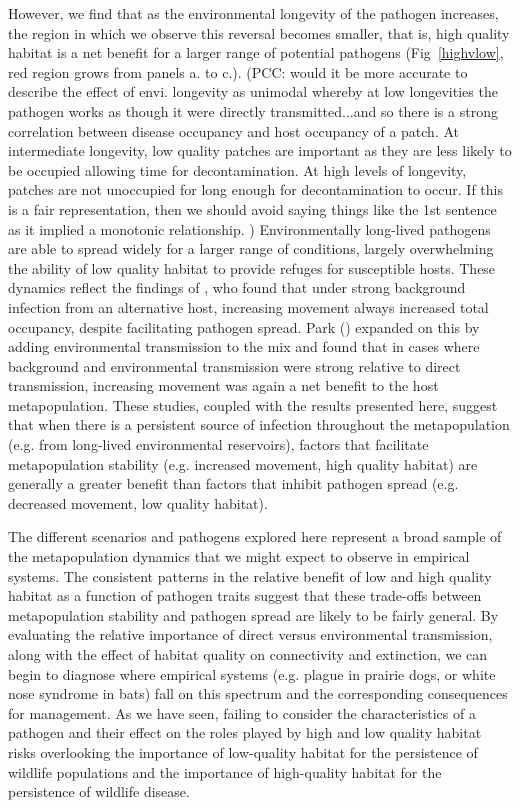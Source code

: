 \documentclass{article}
\begin{document}
However, we find that as the environmental longevity of the pathogen increases, the region in which we observe this reversal becomes smaller, that is, high quality habitat is a net benefit for a larger range of potential pathogens (Fig~\ref{highvlow}, red region grows from panels a. to c.).  (PCC: would it be more accurate to describe the effect of envi. longevity as unimodal whereby at low longevities the pathogen works as though it were directly transmitted...and so there is a strong correlation between disease occupancy and host occupancy of a patch.  At intermediate longevity, low quality patches are important as they are less likely to be occupied allowing time for decontamination. At high levels of longevity, patches are not unoccupied for long enough for decontamination to occur.  If this is a fair representation, then we should avoid saying things like the 1st sentence as it implied a monotonic relationship. )
Environmentally long-lived pathogens are able to spread widely for a larger range of conditions, largely overwhelming the ability of low quality habitat to provide refuges for susceptible hosts. 
These dynamics reflect the findings of \cite{Gog2002}, who found that under strong background infection from an alternative host, increasing movement always increased total occupancy, despite facilitating pathogen spread.  
Park (\cite{Park2012}) expanded on this by adding environmental transmission to the mix and found that in cases where background and environmental transmission were strong relative to direct transmission, increasing movement was again a net benefit to the host metapopulation.  
These studies, coupled with the results presented here, suggest that when there is a persistent source of infection throughout the metapopulation (e.g. from long-lived environmental reservoirs), factors that facilitate metapopulation stability (e.g. increased movement, high quality habitat) are generally a greater benefit than factors that inhibit pathogen spread (e.g. decreased movement, low quality habitat). 

The different scenarios and pathogens explored here represent a broad sample of the metapopulation dynamics that we might expect to observe in empirical systems.
The consistent patterns in the relative benefit of low and high quality habitat as a function of pathogen traits suggest that these trade-offs between metapopulation stability and pathogen spread are likely to be fairly general.  
By evaluating the relative importance of direct versus environmental transmission, along with the effect of habitat quality on connectivity and extinction, we can begin to diagnose where empirical systems (e.g. plague in prairie dogs, or white nose syndrome in bats) fall on this spectrum and the corresponding consequences for management.
As we have seen, failing to consider the characteristics of a pathogen and their effect on the roles played by high and low quality habitat risks overlooking the importance of low-quality habitat for the persistence of wildlife populations and the importance of high-quality habitat for the persistence of wildlife disease.
\end{document}
